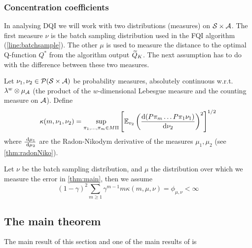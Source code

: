 \subsubsection{Concentration coefficients}

In analysing DQI we will work with two distributions (measures) on $\mathcal{S}
\times \mathcal{A}$.
The first measure $\nu$ is the batch sampling distribution
used in the FQI algorithm (\cref{line:batchsample}). %
The other $\mu$ is used to measure the distance to the optimal Q-function $Q^*$
from the algorithm output $\widetilde{Q}_K$.
The next assumption has to do with the difference between these two measures.

\begin{defn} \label{defn:ccoefs}
  Let $\nu_1, \nu_2 \in \mathcal{P}(\mathcal{S}\times \mathcal{A})$ be probability measures,
  absolutely continuous w.r.t. $\lambda^w \otimes \mu_\mathcal{A}$
  (the product of the $w$-dimensional Lebesgue measure and the counting measure
  on $\mathcal{A}$).
  Define
  \[ \kappa(m, \nu_1, \nu_2) = \sup_{\pi_1, \dots, \pi_m \in M\Pi}
    \left[ \mathbb{E}_{v_2} \left( \frac{\mathrm{d} (P \pi_m \dots P \pi_1 \nu_1)}
  {\mathrm{d} \nu_2} \right)^2 \right]^{1/2} \]
  where $\frac{\; \mathrm{d} \mu_1}{\; \mathrm{d} \mu_2}$ are the Radon-Nikodym derivative
  of the measures $\mu_1, \mu_2$ (see \cref{thm:radonNiko}).
\end{defn}

\begin{asm}\label{asm:A2}
  Let $\nu$ be the batch sampling distribution,
  and $\mu$ the distribution
  over which we measure the error in \cref{thm:main}, then we assume
  \[ (1 - \gamma)^2 \sum_{m\geq 1} \gamma^{m-1} m \kappa(m, \mu, \nu)
  = \phi_{\mu, \nu} < \infty \]
\end{asm}

\subsection{The main theorem}

The main result of this section and one of the main results of  is

